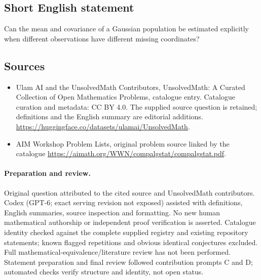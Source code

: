 \documentclass[11pt]{article}
\begin{document}
\subsection{Short English statement}
Can the mean and covariance of a Gaussian population be estimated explicitly when different observations have different missing coordinates?
\subsection{Sources}
\begin{itemize}
\item[\hypertarget{source:statement:1}{S1}] Ulam AI and the UnsolvedMath Contributors, UnsolvedMath: A Curated Collection of Open Mathematics Problems, catalogue entry. Catalogue curation and metadata: CC BY 4.0. The supplied source question is retained; definitions and the English summary are editorial additions.
\url{https://huggingface.co/datasets/ulamai/UnsolvedMath}.
\item[\hypertarget{source:statement:2}{S2}] AIM Workshop Problem Lists, original problem source linked by the catalogue
\url{https://aimath.org/WWN/compalgstat/compalgstat.pdf}.
\end{itemize}
\paragraph{Preparation and review.}
Original question attributed to the cited source and UnsolvedMath contributors. Codex (GPT-6; exact serving revision not exposed) assisted with definitions, English summaries, source inspection and formatting. No new human mathematical authorship or independent proof verification is asserted. Catalogue identity checked against the complete supplied registry and existing repository statements; known flagged repetitions and obvious identical conjectures excluded. Full mathematical-equivalence/literature review has not been performed. Statement preparation and final review followed contribution prompts C and D; automated checks verify structure and identity, not open status.
\label{end:statement}
\end{document}
